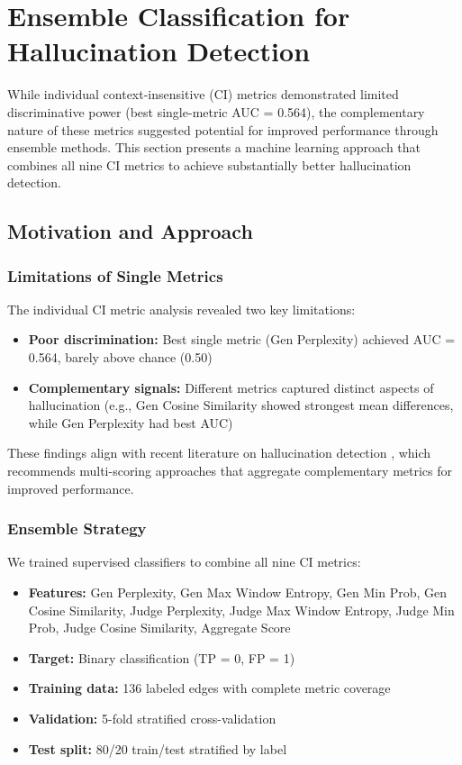 \section{Ensemble Classification for Hallucination Detection}
\label{sec:rq2_ensemble_classifier}

While individual context-insensitive (CI) metrics demonstrated limited discriminative power (best single-metric AUC = 0.564), the complementary nature of these metrics suggested potential for improved performance through ensemble methods. This section presents a machine learning approach that combines all nine CI metrics to achieve substantially better hallucination detection.

\subsection{Motivation and Approach}

\subsubsection{Limitations of Single Metrics}

The individual CI metric analysis revealed two key limitations:
\begin{itemize}
    \item \textbf{Poor discrimination:} Best single metric (Gen Perplexity) achieved AUC = 0.564, barely above chance (0.50)
    \item \textbf{Complementary signals:} Different metrics captured distinct aspects of hallucination (e.g., Gen Cosine Similarity showed strongest mean differences, while Gen Perplexity had best AUC)
\end{itemize}

These findings align with recent literature on hallucination detection \citep{arxiv2024}, which recommends multi-scoring approaches that aggregate complementary metrics for improved performance.

\subsubsection{Ensemble Strategy}

We trained supervised classifiers to combine all nine CI metrics:
\begin{itemize}
    \item \textbf{Features:} Gen Perplexity, Gen Max Window Entropy, Gen Min Prob, Gen Cosine Similarity, Judge Perplexity, Judge Max Window Entropy, Judge Min Prob, Judge Cosine Similarity, Aggregate Score
    \item \textbf{Target:} Binary classification (TP = 0, FP = 1)
    \item \textbf{Training data:} 136 labeled edges with complete metric coverage
    \item \textbf{Validation:} 5-fold stratified cross-validation
    \item \textbf{Test split:} 80/20 train/test stratified by label
\end{itemize}

